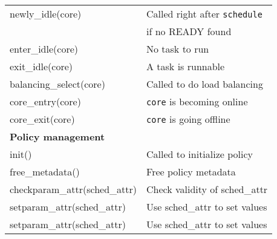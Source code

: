 \begin{table}[htbp!]
\begin{tabular}{|l|l|}
                newly\_idle(core) & Called right after \texttt{schedule}\\& if no READY found\\
                enter\_idle(core) & No task to run\\
                exit\_idle(core) & A task is runnable\\
                balancing\_select(core) & Called to do load balancing\\
                core\_entry(core) & \texttt{core} is becoming online\\
                core\_exit(core) & \texttt{core} is going offline\\
                \hline 

                \textbf{Policy management} & \\
                \hline
                init() & Called to initialize policy\\
                free\_metadata() & Free policy metadata\\
                checkparam\_attr(sched\_attr) & Check validity of sched\_attr\\
                setparam\_attr(sched\_attr) & Use sched\_attr to set values\\
                setparam\_attr(sched\_attr) & Use sched\_attr to set values\\
                \hline
        \end{tabular}
        \label{tab:saakm-callbacks}
\end{table}

